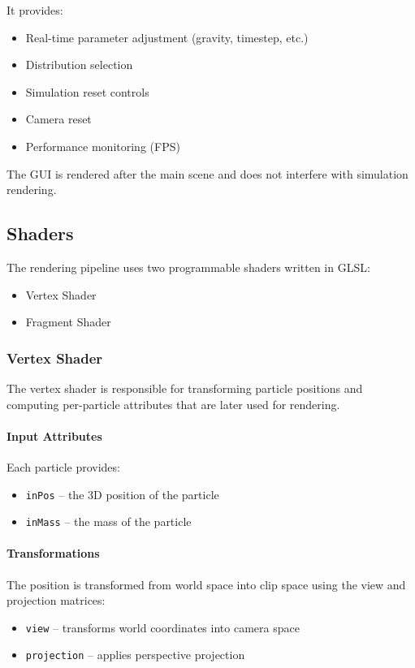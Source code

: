 \documentclass[12pt]{article}
\begin{document}
It provides:
\begin{itemize}
\item Real-time parameter adjustment (gravity, timestep, etc.)
\item Distribution selection
\item Simulation reset controls
\item Camera reset
\item Performance monitoring (FPS)
\end{itemize}

The GUI is rendered after the main scene and does not interfere with simulation rendering.

\subsection{Shaders}

The rendering pipeline uses two programmable shaders written in GLSL:
\begin{itemize}
    \item Vertex Shader
    \item Fragment Shader
\end{itemize}

\subsubsection{Vertex Shader}

The vertex shader is responsible for transforming particle positions and computing per-particle attributes that are later used for rendering.

\paragraph{Input Attributes}
Each particle provides:
\begin{itemize}
\item \texttt{inPos} – the 3D position of the particle
\item \texttt{inMass} – the mass of the particle
\end{itemize}

\paragraph{Transformations}
The position is transformed from world space into clip space using the view and projection matrices:
\begin{itemize}
\item \texttt{view} – transforms world coordinates into camera space
\item \texttt{projection} – applies perspective projection
\end{itemize}
\end{document}
